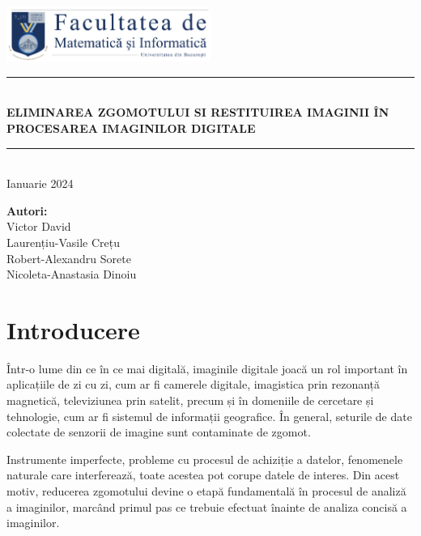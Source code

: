 \documentclass[12pt]{article}
\newcommand{\HRule}[1]{\rule{\linewidth}{#1}}
\begin{document}
\begin{titlepage}
    \centering

	\includegraphics[width=0.5\textwidth]{images/logo2.png} \\[70pt]

    \HRule{0.5pt} \\
    \LARGE \textbf{\uppercase{Eliminarea zgomotului si restituirea imaginii în procesarea imaginilor digitale}}
    \HRule{2pt} \\ [0.5cm]
    \normalsize {Ianuarie 2024} \vspace*{5\baselineskip} \\[110pt]

    \begin{flushleft}
        \centering

        \textbf{Autori:} \\
        Victor David \\
        Laurențiu-Vasile Crețu \\
        Robert-Alexandru Sorete \\ 
        Nicoleta-Anastasia Dinoiu
    \end{flushleft}
    
\end{titlepage}
\newpage

\tableofcontents
\newpage


\section{Introducere}
\label{sec:intro}
Într-o lume din ce în ce mai digitală, imaginile digitale joacă un rol important în aplicațiile de zi cu zi, cum ar fi camerele digitale, imagistica prin rezonanță magnetică, televiziunea prin satelit, precum și în domeniile de cercetare și tehnologie, cum ar fi sistemul de informații geografice. În general, seturile de date colectate de senzorii de imagine sunt contaminate de zgomot. 

Instrumente imperfecte, probleme cu procesul de achiziție a datelor, fenomenele naturale care interferează, toate acestea pot corupe datele de interes. Din acest motiv, reducerea zgomotului devine o etapă fundamentală în procesul de analiză a imaginilor, marcând primul pas ce trebuie efectuat înainte de analiza concisă a imaginilor. 
\end{document}
